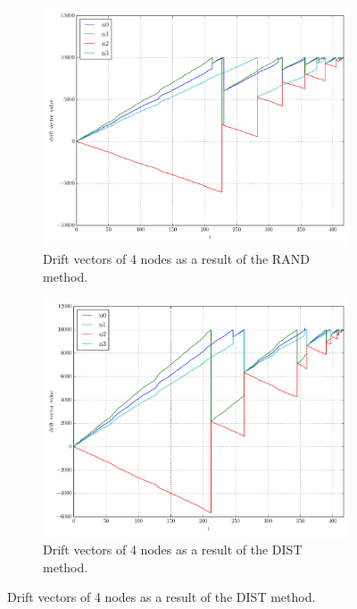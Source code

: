 \begin{figure}[!htb]
\begin{subfigure}{0.32\textwidth}
  \includegraphics[width=\linewidth]{img/matchings_classic_random_drifts.pdf}
  \caption{Drift vectors of 4 nodes as a result of the RAND method.}
\end{subfigure}\hfill
\begin{subfigure}{0.32\textwidth}
  \includegraphics[width=\linewidth]{img/matchings_classic_distoptpair_drifts.pdf}
  \caption{Drift vectors of 4 nodes as a result of the DIST method.}
\end{subfigure}\hfill

\end{figure}
